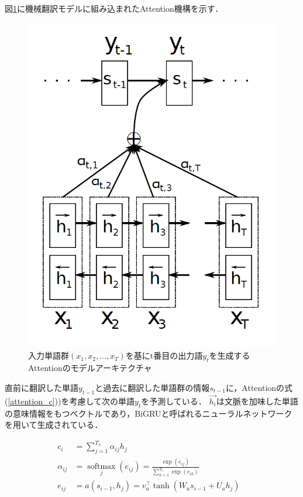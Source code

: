 \documentclass[12pt,a4j]{jreport}
\begin{document}
図\ref{fig_attention}に機械翻訳モデルに組み込まれたAttention機構を示す．

\begin{figure}[H]
	\centering
	\includegraphics[keepaspectratio, width=120mm]{img/attention.png}
	\caption{入力単語群$(x_1, x_2, ... , x_T)$を基にt番目の出力語$y_t$を生成するAttentionのモデルアーキテクチャ\protect\footnotemark[1]}
	\label{fig_attention}
\end{figure}

直前に翻訳した単語$y_{t-1}$と過去に翻訳した単語群の情報$s_{t-1}$に，Attentionの式(\ref{attention_c}))を考慮して次の単語$y_t$を予測している．
$\vec{h_i}$は文脈を加味した単語の意味情報をもつベクトルであり，BiGRUと呼ばれるニューラルネットワークを用いて生成されている．

\begin{align}
  c_{i} &= \sum_{j=1}^{T_{x}} \alpha_{i j} h_{j} &
  \label{attention_c}
  \\
  \alpha_{i j} &= \operatorname*{softmax}_j(e_{ij}) = \frac{\exp \left(e_{i j}\right)}{\sum_{k=1}^{T_{x}} \exp \left(e_{i k}\right)}
  \label{attention_alpha}
  \\
  e_{i j} &= a\left(s_{i-1}, h_{j}\right) = v_{a}^{\top} \tanh \left(W_{a} s_{i-1}+U_{a} h_{j}\right)
  \label{attention_e}
\end{align}
\end{document}
